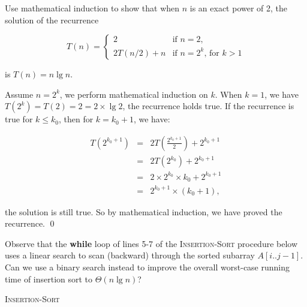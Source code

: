 

Use mathematical induction to show that when $n$ is an exact power of 2, the solution of the recurrence

\begin{equation*}
T(n) = \left\{
  \begin{array}{ll}
    2         & \text{if $n=2$,}\\
    2T(n/2)+n & \text{if $n=2^k$, for $k>1$}
  \end{array}
\right.
\end{equation*}

is $T(n)=n\lg n$.

\proof

Assume $n = 2^k$, we perform mathematical induction on $k$. When $k =1$, we have $T(2^k) = T(2) = 2 = 2\times \lg 2$, the recurrence holds true.
If the recurrence is true for $ k \leq k_0$, then for $k = k_0 + 1$, we have:

\begin{eqnarray*}
T(2^{k_0 + 1}) &=& 2T\left(\frac{2^{k_0 + 1}}{2}\right) + 2^{k_0 + 1}\\
&=& 2T(2^{k_0}) + 2^{k_0 + 1}\\
&=& 2\times 2^{k_0} \times k_0 + 2^{k_0 + 1}\\
&=& 2^{k_0 + 1} \times (k_0 + 1),
\end{eqnarray*}

the solution is still true. So by mathematical induction, we have proved the recurrence.
\qed


Observe that the \textbf{while} loop of lines 5-7 of the \textsc{Insertion-Sort} procedure below uses a linear search to scan (backward)
through the sorted subarray $A[i..j-1]$. Can we use a binary search instead to improve the overall worst-case running
time of insertion sort to $\Theta(n\lg n)$?

\begin{algorithm}[H]
\caption{\textsc{Insertion-Sort}}
\end{algorithm}


